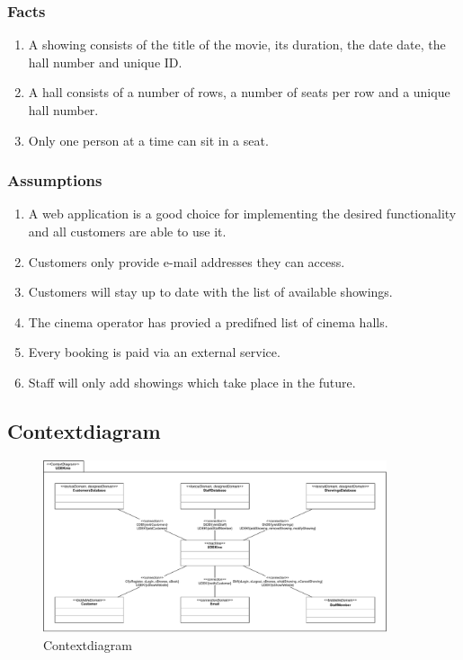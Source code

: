 \documentclass[a4paper,10pt,titlepage,bibtotoc,bibtotocnumbered]{scrreprt}
\begin{document}
\subsubsection{Facts}
\begin{enumerate}[F1]
	\item A showing consists of the title of the movie, its duration, the date date, the hall number and unique ID.
	\item A hall consists of a number of rows, a number of seats per row and a unique hall number.
    \item Only one person at a time can sit in a seat.
\end{enumerate}

\subsubsection{Assumptions}
\begin{enumerate}[{A}1]
	\item A web application is a good choice for implementing the desired functionality and all customers are able to use it.
	\item Customers only provide e-mail addresses they can access.
    \item Customers will stay up to date with the list of available showings.
    \item The cinema operator has provied a predifned list of cinema halls.
    \item Every booking is paid via an external service.
    \item Staff will only add showings which take place in the future.
\end{enumerate}

\subsection{Contextdiagram}
\begin{figure}[H]
	\centering
  	\includegraphics[width=0.9\textwidth]{figures/02/a02_context_diagram.pdf}
	\caption{Contextdiagram}
	\label{figure:contextDiagram}
\end{figure}
\end{document}
